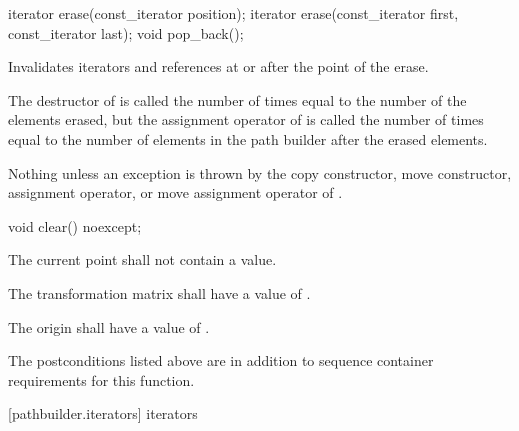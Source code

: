 \begin{itemdecl}
iterator erase(const_iterator position);
iterator erase(const_iterator first, const_iterator last);
void pop_back();
\end{itemdecl}

\begin{itemdescr}
\pnum
\effects
Invalidates iterators and references at or after the point of the erase.

\pnum
\complexity
The destructor of  is called the number of times equal to 
the number of the elements erased, but the assignment operator
of  is called the number of times equal to the number of
elements in the path builder after the erased elements.

\pnum
\throws
Nothing unless an exception is thrown by the copy constructor, move 
constructor, assignment operator, or move assignment operator of
.
\end{itemdescr}

\begin{itemdecl}
void clear() noexcept;
\end{itemdecl}
\begin{itemdescr}
\pnum
\postconditions
\pnum
The current point shall not contain a value.

\pnum
The transformation matrix shall have a value of .

\pnum
The origin shall have a value of .

\pnum
\remarks
The postconditions listed above are in addition to sequence container requirements for this function.
\end{itemdescr}

 [pathbuilder.iterators] { iterators}

